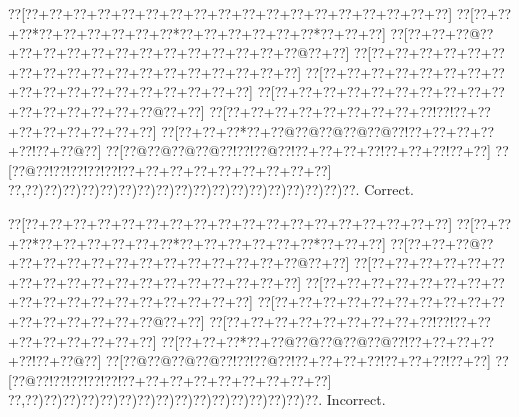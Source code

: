 \documentclass[a5paper]{article}
\begin{document}
\begin{center}
{\goo
\0??[\0??+\0??+\0??+\0??+\0??+\0??+\0??+\0??+\0??+\0??+\0??+\0??+\0??+\0??+\0??+\0??+\0??+\0??]
\0??[\0??+\0??+\0??*\0??+\0??+\0??+\0??+\0??+\0??*\0??+\0??+\0??+\0??+\0??+\0??*\0??+\0??+\0??]
\0??[\0??+\0??+\0??@\0??+\0??+\0??+\0??+\0??+\0??+\0??+\0??+\0??+\0??+\0??+\0??+\0??@\0??+\0??]
\0??[\0??+\0??+\0??+\0??+\0??+\0??+\0??+\0??+\0??+\0??+\0??+\0??+\0??+\0??+\0??+\0??+\0??+\0??]
\0??[\0??+\0??+\0??+\0??+\0??+\0??+\0??+\0??+\0??+\0??+\0??+\0??+\0??+\0??+\0??+\0??+\0??+\0??]
\0??[\0??+\0??+\0??+\0??+\0??+\0??+\0??+\0??+\0??+\0??+\0??+\0??+\0??+\0??+\0??+\0??@\0??+\0??]
\0??[\0??+\0??+\0??+\0??+\0??+\0??+\0??+\0??+\0??!\0??!\0??+\0??+\0??+\0??+\0??+\0??+\0??+\0??]
\0??[\0??+\0??+\0??*\0??+\0??@\0??@\0??@\0??@\0??@\0??!\0??+\0??+\0??+\0??+\0??!\0??+\0??@\0??]
\0??[\0??@\0??@\0??@\0??@\0??!\0??!\0??@\0??!\0??+\0??+\0??+\0??!\0??+\0??+\0??!\0??+\0??]
\0??[\0??@\0??!\0??!\0??!\0??!\0??!\0??+\0??+\0??+\0??+\0??+\0??+\0??+\0??+\0??]
\0??,\0??)\0??)\0??)\0??)\0??)\0??)\0??)\0??)\0??)\0??)\0??)\0??)\0??)\0??)\0??)\0??)\0??)\0??.
}
Correct. 

\end{center}
\begin{center}
{\goo
\0??[\0??+\0??+\0??+\0??+\0??+\0??+\0??+\0??+\0??+\0??+\0??+\0??+\0??+\0??+\0??+\0??+\0??+\0??]
\0??[\0??+\0??+\0??*\0??+\0??+\0??+\0??+\0??+\0??*\0??+\0??+\0??+\0??+\0??+\0??*\0??+\0??+\0??]
\0??[\0??+\0??+\0??@\0??+\0??+\0??+\0??+\0??+\0??+\0??+\0??+\0??+\0??+\0??+\0??+\0??@\0??+\0??]
\0??[\0??+\0??+\0??+\0??+\0??+\0??+\0??+\0??+\0??+\0??+\0??+\0??+\0??+\0??+\0??+\0??+\0??+\0??]
\0??[\0??+\0??+\0??+\0??+\0??+\0??+\0??+\0??+\0??+\0??+\0??+\0??+\0??+\0??+\0??+\0??+\0??+\0??]
\0??[\0??+\0??+\0??+\0??+\0??+\0??+\0??+\0??+\0??+\0??+\0??+\0??+\0??+\0??+\0??+\0??@\0??+\0??]
\0??[\0??+\0??+\0??+\0??+\0??+\0??+\0??+\0??+\0??!\0??!\0??+\0??+\0??+\0??+\0??+\0??+\0??+\0??]
\0??[\0??+\0??+\0??*\0??+\0??@\0??@\0??@\0??@\0??@\0??!\0??+\0??+\0??+\0??+\0??!\0??+\0??@\0??]
\0??[\0??@\0??@\0??@\0??@\0??!\0??!\0??@\0??!\0??+\0??+\0??+\0??!\0??+\0??+\0??!\0??+\0??]
\0??[\0??@\0??!\0??!\0??!\0??!\0??!\0??+\0??+\0??+\0??+\0??+\0??+\0??+\0??+\0??]
\0??,\0??)\0??)\0??)\0??)\0??)\0??)\0??)\0??)\0??)\0??)\0??)\0??)\0??)\0??)\0??)\0??.
}
Incorrect. 

\end{center}
\newpage
\end{document}
